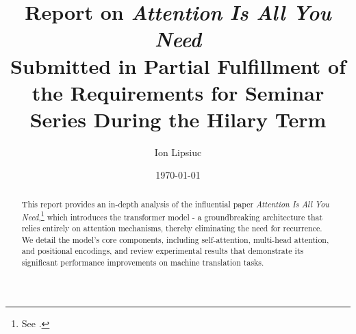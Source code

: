 \documentclass[12pt]{article}
\title{Report on \textit{Attention Is All You Need}\\\vspace{0.5cm}\large Submitted in Partial Fulfillment of the Requirements for Seminar Series During the Hilary Term}
\author{Ion Lipsiuc}
\date{\today}
\begin{document}
\maketitle

\begin{abstract}
  \noindent
  This report provides an in-depth analysis of the influential paper \textit{Attention Is All You Need},\footnote{See \citep{vaswani2017attention}.} which introduces the transformer model - a groundbreaking architecture that relies entirely on attention mechanisms, thereby eliminating the need for recurrence. We detail the model's core components, including self-attention, multi-head attention, and positional encodings, and review experimental results that demonstrate its significant performance improvements on machine translation tasks.
\end{abstract}

\tableofcontents
\newpage









\end{document}
